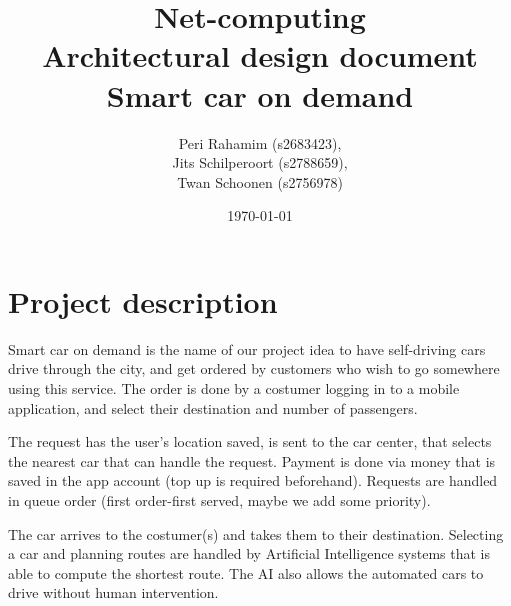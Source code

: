 \documentclass[a4paper]{article}
\begin{document}
\title{Net-computing\\
Architectural design document\\
Smart car on demand
}

\date{\today}

\author{Peri Rahamim (s2683423),\\
Jits Schilperoort (s2788659),\\
Twan Schoonen (s2756978)
}




\maketitle
\section*{Project description}
Smart car on demand is the name of our project idea to have self-driving cars drive through the city, and get ordered by customers who wish to go somewhere using this service. The order is done by a costumer logging in to a mobile application, and select their destination and number of passengers.

The request has the user's location saved, is sent to the car center, that selects the nearest car that can handle the request. Payment is done via money that is saved in the app account (top up is required beforehand). Requests are handled in queue order (first order-first served, maybe we add some priority).

The car arrives to the costumer(s) and takes them to their destination. Selecting a car and planning routes are handled by Artificial Intelligence systems that is able to compute the shortest route. The AI also allows the automated cars to drive without human intervention.
\end{document}
